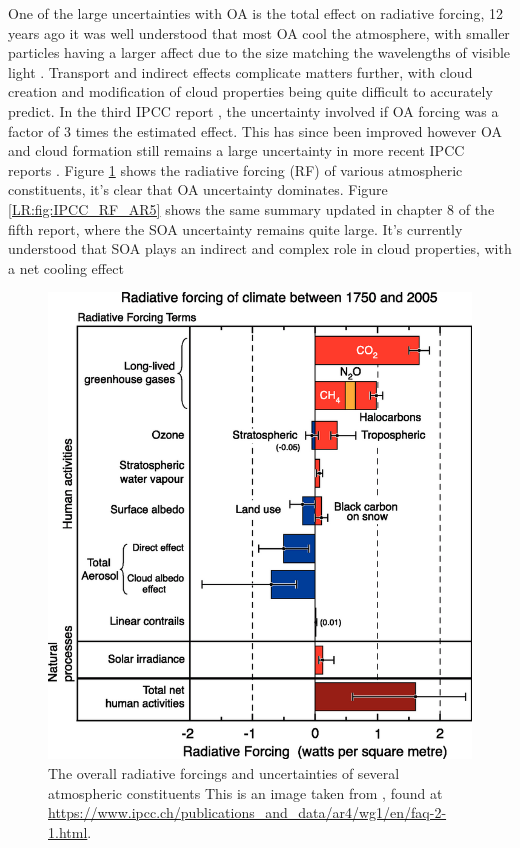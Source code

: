       One of the large uncertainties with OA is the total effect on radiative forcing, 12 years ago it was well understood that most OA cool the atmosphere, with smaller particles having a larger affect due to the size matching the wavelengths of visible light \citep{Kanakidou2005}. 
      Transport and indirect effects complicate matters further, with cloud creation and modification of cloud properties being quite difficult to accurately predict.
      In the third IPCC report \citep{IPCC2001}, the uncertainty involved if OA forcing was a factor of 3 times the estimated effect. 
      This has since been improved however OA and cloud formation still remains a large uncertainty in more recent IPCC reports \citep{IPCC_Chapter2}.
      Figure \ref{LR:fig:IPCC_RF_AR4} shows the radiative forcing (RF) of various atmospheric constituents, it's clear that OA uncertainty dominates.
      Figure \ref{LR:fig:IPCC_RF_AR5} shows the same summary updated in chapter 8 of the fifth report, where the SOA uncertainty remains quite large.
      It's currently understood that SOA plays an indirect and complex role in cloud properties, with a net cooling effect \citep[Chapter 7,8]{IPCC_AR5_WG1}
      
      \begin{figure}
        \includegraphics[width=\textwidth]{Figures/IPCC_WG1AR4_RFSummary.png}
        \caption{%
          The overall radiative forcings and uncertainties of several atmospheric constituents
  	      This is an image taken from \cite{IPCC_Chapter2}, found at \url{https://www.ipcc.ch/publications_and_data/ar4/wg1/en/faq-2-1.html}.}
        \label{LR:fig:IPCC_RF_AR4}
      \end{figure}
  
